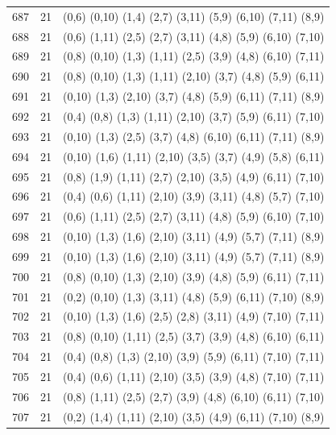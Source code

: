 \begin{appendix}
{\begin{longtable}{lll}
    687& 21 & (0,6)   (0,10)  (1,4)   (2,7)   (3,11)  (5,9)   (6,10)  (7,11)  (8,9)\\
    688& 21 & (0,6)   (1,11)  (2,5)   (2,7)   (3,11)  (4,8)   (5,9)   (6,10)  (7,10)\\
    689& 21 & (0,8)   (0,10)  (1,3)   (1,11)  (2,5)   (3,9)   (4,8)   (6,10)  (7,11)\\
    690& 21 & (0,8)   (0,10)  (1,3)   (1,11)  (2,10)  (3,7)   (4,8)   (5,9)   (6,11)\\
    691& 21 & (0,10)  (1,3)   (2,10)  (3,7)   (4,8)   (5,9)   (6,11)  (7,11)  (8,9)\\
    692& 21 & (0,4)   (0,8)   (1,3)   (1,11)  (2,10)  (3,7)   (5,9)   (6,11)  (7,10)\\
    693& 21 & (0,10)  (1,3)   (2,5)   (3,7)   (4,8)   (6,10)  (6,11)  (7,11)  (8,9)\\
    694& 21 & (0,10)  (1,6)   (1,11)  (2,10)  (3,5)   (3,7)   (4,9)   (5,8)   (6,11)\\
    695& 21 & (0,8)   (1,9)   (1,11)  (2,7)   (2,10)  (3,5)   (4,9)   (6,11)  (7,10)\\
    696& 21 & (0,4)   (0,6)   (1,11)  (2,10)  (3,9)   (3,11)  (4,8)   (5,7)   (7,10)\\
    697& 21 & (0,6)   (1,11)  (2,5)   (2,7)   (3,11)  (4,8)   (5,9)   (6,10)  (7,10)\\
    698& 21 & (0,10)  (1,3)   (1,6)   (2,10)  (3,11)  (4,9)   (5,7)   (7,11)  (8,9)\\
    699& 21 & (0,10)  (1,3)   (1,6)   (2,10)  (3,11)  (4,9)   (5,7)   (7,11)  (8,9)\\
    700& 21 & (0,8)   (0,10)  (1,3)   (2,10)  (3,9)   (4,8)   (5,9)   (6,11)  (7,11)\\
    701& 21 & (0,2)   (0,10)  (1,3)   (3,11)  (4,8)   (5,9)   (6,11)  (7,10)  (8,9)\\
    702& 21 & (0,10)  (1,3)   (1,6)   (2,5)   (2,8)   (3,11)  (4,9)   (7,10)  (7,11)\\
    703& 21 & (0,8)   (0,10)  (1,11)  (2,5)   (3,7)   (3,9)   (4,8)   (6,10)  (6,11)\\
    704& 21 & (0,4)   (0,8)   (1,3)   (2,10)  (3,9)   (5,9)   (6,11)  (7,10)  (7,11)\\
    705& 21 & (0,4)   (0,6)   (1,11)  (2,10)  (3,5)   (3,9)   (4,8)   (7,10)  (7,11)\\
    706& 21 & (0,8)   (1,11)  (2,5)   (2,7)   (3,9)   (4,8)   (6,10)  (6,11)  (7,10)\\
    707& 21 & (0,2)   (1,4)   (1,11)  (2,10)  (3,5)   (4,9)   (6,11)  (7,10)  (8,9)\\

\end{longtable}}
\end{appendix}
